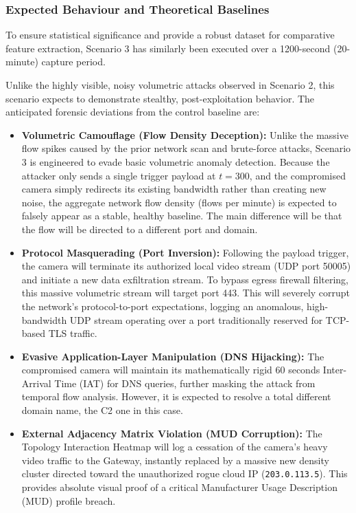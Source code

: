 \subsubsection{Expected Behaviour and Theoretical Baselines}

To ensure statistical significance and provide a robust dataset for comparative feature extraction, Scenario 3 has similarly been executed over a 1200-second (20-minute) capture period. 

Unlike the highly visible, noisy volumetric attacks observed in Scenario 2, this scenario expects to demonstrate stealthy, post-exploitation behavior. The anticipated forensic deviations from the control baseline are:

\begin{itemize}
	\item \textbf{Volumetric Camouflage (Flow Density Deception):} Unlike the massive flow spikes caused by the prior network scan and brute-force attacks, Scenario 3 is engineered to evade basic volumetric anomaly detection. Because the attacker only sends a single trigger payload at $t=300$, and the compromised camera simply redirects its existing bandwidth rather than creating new noise, the aggregate network flow density (flows per minute) is expected to falsely appear as a stable, healthy baseline. The main difference will be that the flow will be directed to a different port and domain. 
	
	\item \textbf{Protocol Masquerading (Port Inversion):} Following the payload trigger, the camera will terminate its authorized local video stream (UDP port 50005) and initiate a new data exfiltration stream. To bypass egress firewall filtering, this massive volumetric stream will target port 443. This will severely corrupt the network's protocol-to-port expectations, logging an anomalous, high-bandwidth UDP stream operating over a port traditionally reserved for TCP-based TLS traffic.
	
	\item \textbf{Evasive Application-Layer Manipulation (DNS Hijacking):} The compromised camera will maintain its mathematically rigid 60 seconds Inter-Arrival Time (IAT) for DNS queries, further masking the attack from temporal flow analysis. However, it is expected to resolve a total different domain name, the C2 one in this case.
	
	\item \textbf{External Adjacency Matrix Violation (MUD Corruption):} The Topology Interaction Heatmap will log a cessation of the camera's heavy video traffic to the Gateway, instantly replaced by a massive new density cluster directed toward the unauthorized rogue cloud IP (\texttt{203.0.113.5}). This provides absolute visual proof of a critical Manufacturer Usage Description (MUD) profile breach.
\end{itemize}

